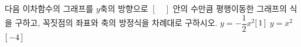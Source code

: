 다음 이차함수의 그래프를 $y$축의 방향으로 $[\quad]$ 안의 수만큼 평행이동한 그래프의 식을 구하고, 꼭짓점의 좌표와 축의 방정식을 차례대로 구하시오.
 $y=-\dfrac{1}{2}x^2$\quad$[\mkern3mu 1\mkern3mu ]$
 $y=x^2$\quad$[\mkern3mu -4\mkern3mu ]$
